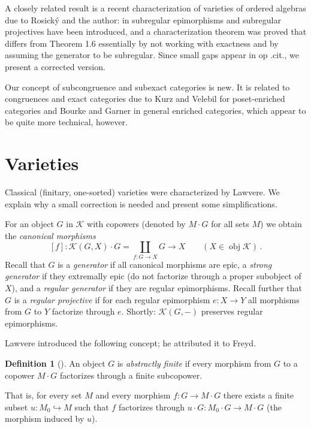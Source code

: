 \documentclass[12pt,amstex,leqno]{amsart}
\newcommand\obj{\operatorname{obj}}
\newcommand\ck{\mathcal {K}}
\theoremstyle{definition}
\newtheorem{defi}[theorem]{Definition}
\numberwithin{equation}{section}
\begin{document}
	 A closely related result is a recent characterization of varieties of ordered algebras due to Rosick{\'{y}} and the author: in \cite{ARO} subregular epimorphisms and subregular projectives have been introduced, and a characterization theorem was proved that differs from Theorem 1.6 essentially by not working with exactness and by assuming the generator to be subregular. Since small gaps appear in op .cit., we present a corrected version.
	
	Our concept of subcongruence and subexact categories is new. It is related to congruences and exact categories due to Kurz and Velebil \cite{KV} for poset-enriched categories and Bourke and Garner \cite{BG} in general enriched categories, which appear to be quite more technical, however.
	
	\section{Varieties}\label{sec2}
	
	Classical (finitary, one-sorted) varieties were characterized by Lawvere. We explain why a small correction is needed and present some simplifications.
	
	For an object $G$ in $\ck$ with copowers (denoted by $M\cdot G$ for all sets $M$) we obtain the \emph{canonical morphisms}
	$$
	[f]\colon \ck(G,X)\cdot G =\coprod_{f\colon G\to X} G \longrightarrow X \qquad (X\in \obj \ck)\,.
	$$
	Recall that $G$ is a \emph{generator} if all canonical morphisms are epic, a \emph{strong generator} if they extremally epic (do not factorize through a proper subobject of $X$), and a \emph{regular generator} if they are regular epimorphisms. Recall further that $G$ is a \emph{regular  projective} if for each regular
	epimorphism $e\colon X\to Y$  all morphisms from $G$ to $Y$ factorize through $e$. Shortly: $\ck (G,-)$ preserves regular epimorphisms.
	
	Lawvere introduced the following concept; he attributed  it to Freyd.

\begin{defi}[\cite{L}]\label{D:abs} %
	An object $G$ is \emph{abstractly finite} if every morphism from $G$ to a copower $M\cdot G$ factorizes through a finite subcopower.
\end{defi}

That is, for every set $M$ and every morphism $f\colon G\to M\cdot G$  there exists a finite subset $u\colon M_0 \hookrightarrow M$ such that  $f$ factorizes through $u\cdot G\colon M_0 \cdot G \to M\cdot G$ (the morphism  induced by $u$).
\end{document}
